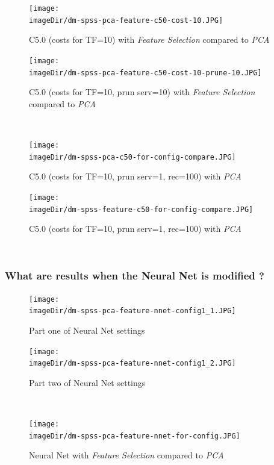 \documentclass[11pt, a4paper, twoside]{article}   	%
\newcommand{\imageDir}{./images/}
\begin{document}
\begin{figure}[h]
\centering
\texttt{[image: \\imageDir/dm-spss-pca-feature-c50-cost-10.JPG]}
\caption{C5.0 (costs for TF=10) with \emph{Feature Selection} compared to \emph{PCA}}
\end{figure}

\begin{figure}[h]
\centering
\texttt{[image: \\imageDir/dm-spss-pca-feature-c50-cost-10-prune-10.JPG]}
\caption{C5.0 (costs for TF=10, prun serv=10) with \emph{Feature Selection} compared to \emph{PCA}}
\end{figure}
\ \newpage

\begin{figure}[h]
\centering
\texttt{[image: \\imageDir/dm-spss-pca-c50-for-config-compare.JPG]}
\caption{C5.0 (costs for TF=10, prun serv=1, rec=100) with \emph{PCA}}
\end{figure}

\begin{figure}[h]
\centering
\texttt{[image: \\imageDir/dm-spss-feature-c50-for-config-compare.JPG]}
\caption{C5.0 (costs for TF=10, prun serv=1, rec=100) with \emph{PCA}}
\end{figure}
\ \newpage

\subsubsection{What are results when the Neural Net is modified ? }
\begin{figure}[h]
\centering
\texttt{[image: \\imageDir/dm-spss-pca-feature-nnet-config1\_1.JPG]}
\caption{Part one of Neural Net settings}
\end{figure}

\begin{figure}[h]
\centering
\texttt{[image: \\imageDir/dm-spss-pca-feature-nnet-config1\_2.JPG]}
\caption{Part two of Neural Net settings}
\end{figure}
\ \newpage

\begin{figure}[h]
\centering
\texttt{[image: \\imageDir/dm-spss-pca-feature-nnet-for-config.JPG]}
\caption{Neural Net with \emph{Feature Selection} compared to \emph{PCA}}
\end{figure}
\end{document}

